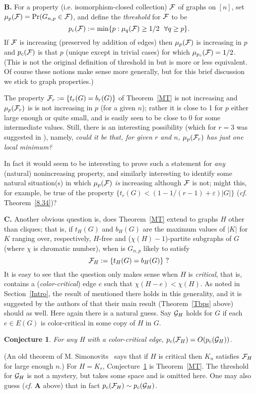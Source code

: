 \documentclass[letterpaper,11pt]{article}
\newtheorem{conj}[thm]{Conjecture}
\newcommand{\mn}[0]{\medskip\noindent}
\newcommand{\nin}[0]{\noindent}
\newcommand{\f}[0]{{\cal F}}
\newcommand{\g}[0]{{\cal G}}
\newcommand{\bb}[0]{b}
\newcommand{\ttt}[0]{t}
\newcommand{\0}[0]{\emptyset}
\newcommand{\eps}[0]{\varepsilon }
\begin{document}
\mn
{\bf B.}
For a property (i.e. isomorphism-closed
collection) $\f$ of graphs on $[n]$,
set
$\mu_p(\f)=\Pr(G_{n,p}\in \f)$,
%
and define the {\em threshold} for $\f$ to be
\[
p_c(\f):=\min\{p:\mu_q(\f)\geq 1/2 ~~\forall q\geq p \}.
\]
If $\f$ is increasing (preserved by addition of edges) then
$\mu_p(\f)$ is increasing in $p$ and $p_c(\f)$ is that
$p$ (unique except in trivial cases)
for which $\mu_{p_c}(\f)=1/2$.  (This is not the original definition of threshold in
\cite{ER}
but is more or less equivalent.
Of course these notions make sense more generally, but for this brief discussion
we stick to graph properties.)



The property
$\f_r:=\{\ttt_r(G)=\bb_r(G)\}$ of
Theorem~\ref{MT}
is not increasing and $\mu_p(\f_r)$ is
is not increasing in $p$
(for a given $n$);
rather it is close to 1 for $p$ either
large enough or quite small,
and is easily seen to be close to 0
for some intermediate values.
%
Still, there is an interesting possibility
(which for $r=3$ was suggested in \cite{DKMantel}), namely,
{\em could it be that, for given $r $ and $n$,
$\mu_p(\f_r)$
has just
one local minimum?}
%

In fact it would seem to be interesting to prove such a statement for
{\em any} (natural) nonincreasing property,
%
and similarly interesting to identify some natural
situation(s) in which $\mu_p(\f)$ {\em is} increasing
although $\f$ is not;
might this, for example, be true of the property
$\{t_r(G)< (1-1/(r-1)+\eps)|G|\}$ ({\em cf.} Theorem~\ref{8.34})?






\mn
{\bf C.}
Another obvious question is, does
Theorem~\ref{MT} extend to graphs $H$ other than cliques; that is, if
$t_H(G)$ and $b_H(G)$ are the maximum
values of $|K|$ for $K$ ranging over,
respectively, $H$-free and ($\chi(H)-1$)-partite subgraphs of $G$
(where $\chi$ is chromatic number),
when is $G_{n,p}$ likely to satisfy
\[
\f_H:=\{t_H(G)=b_H(G)\}~?
\]
It is easy to see
that the question only makes sense when $H$ is {\em critical}, that is,
contains a ({\em color-critical}) edge
$e$ such that $\chi(H-e)<\chi(H)$.
%
As noted in Section~\ref{Intro},
the
result of \cite{BSS} mentioned there
holds in this generality,
and it is suggested by the authors of \cite{BPS} that their main result
(Theorem~\ref{Tbps} above) should as well.
%
Here again there is a natural guess.
%
Say $\g_H$ holds for $G$ if each $e\in E(G)$ is color-critical in some copy of $H$ in $G$.
%
\begin{conj}\label{Hconj}
For any H with a color-critical edge,
$p_c(\f_H)=O( p_c(\g_H))$.
\end{conj}
\nin
(An old theorem of M. Simonovits~\cite{Simonovits}
says that if $H$ is critical then $K_n$ satisfies $\f_H$
for large enough $n$.)
For $H=K_r$, Conjecture~\ref{Hconj} is Theorem~\ref{MT}.
The threshold for $\g_H$ is not a mystery, but takes some
space and is omitted here.
One may also guess ({\em cf.} {\bf A} above) that in fact $p_c(\f_H)\sim p_c(\g_H)$.
%
\end{document}
